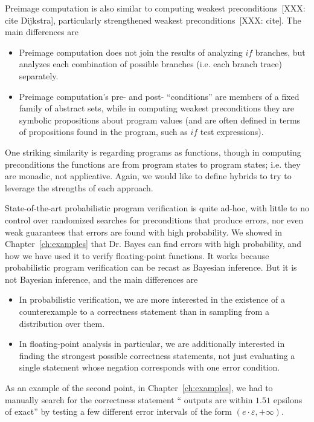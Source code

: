 Preimage computation is also similar to computing weakest preconditions~[XXX: cite Dijkstra], particularly strengthened weakest preconditions~[XXX: cite].
The main differences are
\begin{itemize}
	\item Preimage computation does not join the results of analyzing $if$ branches, but analyzes each combination of possible branches (i.e. each branch trace) separately.
	\item Preimage computation's pre- and post- ``conditions'' are members of a fixed family of abstract sets, while in computing weakest preconditions they are symbolic propositions about program values (and are often defined in terms of propositions found in the program, such as $if$ test expressions).
\end{itemize}
One striking similarity is regarding programs as functions, though in computing preconditions the functions are from program states to program states; i.e. they are monadic, not applicative.
Again, we would like to define hybrids to try to leverage the strengths of each approach.

State-of-the-art probabilistic program verification is quite ad-hoc, with little to no control over randomized searches for preconditions that produce errors, nor even weak guarantees that errors are found with high probability.
We showed in Chapter~\ref{ch:examples} that Dr. Bayes can find errors with high probability, and how we have used it to verify floating-point functions.
It works because probabilistic program verification can be recast as Bayesian inference.
But it is not Bayesian inference, and the main differences are
\begin{itemize}
	\item In probabilistic verification, we are more interested in the existence of a counterexample to a correctness statement than in sampling from a distribution over them.
	\item In floating-point analysis in particular, we are additionally interested in finding the strongest possible correctness statements, not just evaluating a single statement whose negation corresponds with one error condition.
\end{itemize}
As an example of the second point, in Chapter~\ref{ch:examples}, we had to manually search for the correctness statement `` outputs are within $1.51$ epsilons of exact'' by testing a few different error intervals of the form $(e \cdot \varepsilon,+\infty)$.

